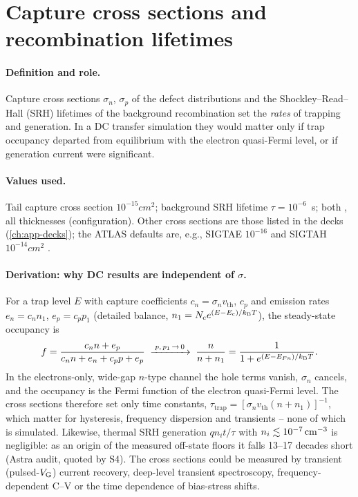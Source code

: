 \section{Capture cross sections and recombination lifetimes}
\label{sec:par-capture}

\paragraph{Definition and role.}
Capture cross sections $\sigma_n$, $\sigma_p$ of the defect distributions and the Shockley--Read--Hall (SRH)
lifetimes of the background recombination set the \emph{rates} of trapping and generation. In a DC transfer
simulation they would matter only if trap occupancy departed from equilibrium with the electron quasi-Fermi level,
or if generation current were significant.

\paragraph{Values used.}
Tail capture cross section $10^{-15}\si{cm^2}$; background SRH lifetime $\tau = 10^{-6}$~s; both , all
thicknesses (configuration). Other cross sections are those listed in the decks (\cref{ch:app-decks}); the ATLAS
defaults are, e.g., SIGTAE $10^{-16}$ and SIGTAH $10^{-14}\si{cm^2}$ \citep[p.~1169]{AtlasManual}.

\paragraph{Derivation: why DC results are independent of $\sigma$.}
For a trap level $E$ with capture coefficients $c_n = \sigma_n v_{\mathrm{th}}$, $c_p$ and emission rates
$e_n = c_n n_1$, $e_p = c_p p_1$ (detailed balance, $n_1 = N_{\mathrm{c}} e^{(E-E_{\mathrm{c}})/k_{\mathrm{B}}T}$), the steady-state occupancy is
\begin{equation}
  f = \frac{c_n n + e_p}{c_n n + e_n + c_p p + e_p}
    \;\xrightarrow{\;p,\,p_1\,\rightarrow\,0\;}\;
    \frac{n}{n+n_1} = \frac{1}{1+e^{(E-E_{Fn})/k_{\mathrm{B}}T}} .
  \label{eq:d1-srh-occ}
\end{equation}
In the electrons-only, wide-gap $n$-type channel the hole terms vanish, $\sigma_n$ cancels, and the occupancy is the
Fermi function of the electron quasi-Fermi level. The cross sections therefore set only time constants,
$\tau_{\mathrm{trap}} = [\sigma_n v_{\mathrm{th}}(n+n_1)]^{-1}$, which matter for hysteresis, frequency dispersion and
transients -- none of which is simulated. Likewise, thermal SRH generation $q n_i t/\tau$ with $n_i\lesssim10^{-7}\,\mathrm{cm}^{-3}$
is negligible: as an origin of the measured off-state floors it falls 13--17 decades short (Astra audit, quoted by S4).
The cross sections could be measured by transient (pulsed-$V_{\mathrm{G}}$) current recovery, deep-level transient spectroscopy,
frequency-dependent C--V or the time dependence of bias-stress shifts.

